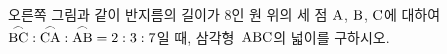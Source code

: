 \noindent\begin{minipage}[t]{0.58\linewidth}\vspace{0pt}\raggedright 오른쪽 그림과 같이 반지름의 길이가 $8$인 원 위의 세 점 $\mathrm{A}$, $\mathrm{B}$, $\mathrm{C}$에 대하여 $\overset{\frown}{\mathrm{BC}}:\overset{\frown}{\mathrm{CA}}:\overset{\frown}{\mathrm{AB}}=2:3:7$일 때, 삼각형~$\mathrm{ABC}$의 넓이를 구하시오. \end{minipage}\hfill\begin{minipage}[t]{0.4\linewidth}\vspace{0pt}\centering \resizebox{\ifdim\width>\linewidth\linewidth\else\width\fi}{!}{}\end{minipage}\par
